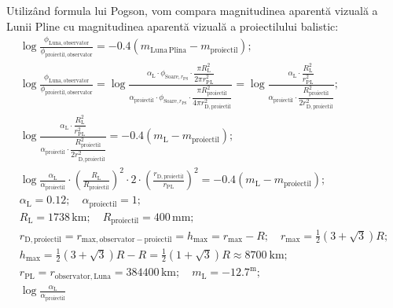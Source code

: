 \begin{description}
  Utiliz\^and formula lui Pogson, vom compara magnitudinea aparent\u{a}
  vizual\u{a} a Lunii Pline cu magnitudinea aparent\u{a} vizual\u{a} a
  proiectilului balistic:
  \begin{gather*}
    \log\frac{\phi_{\mathrm{Luna,observator}}}
      {\phi_{\mathrm{proiectil,observator}}}
      = -0.4\left(m_{\mathrm{Luna\,Plina}}
        - m_{\mathrm{proiectil}}\right); \\
    \log\frac{\phi_{\mathrm{Luna,observator}}}
      {\phi_{\mathrm{proiectil,observator}}}
      = \log\frac{\alpha_{\mathrm{L}}\cdot
        \phi_{\mathrm{Soare},r_{\mathrm{PS}}}\cdot
        \dfrac{\pi R_{\mathrm{L}}^2}{2\pi r_{\mathrm{PL}}^2}}
        {\alpha_{\mathrm{proiectil}}\cdot
        \phi_{\mathrm{Soare},r_{\mathrm{PS}}}\cdot
        \dfrac{\pi R_{\mathrm{proiectil}}^2}
          {4\pi r_{\mathrm{D,proiectil}}^2}}
      = \log\frac{\alpha_{\mathrm{L}}\cdot
        \dfrac{R_{\mathrm{L}}^2}{r_{\mathrm{PL}}^2}}
        {\alpha_{\mathrm{proiectil}}\cdot
        \dfrac{R_{\mathrm{proiectil}}^2}{2r_{\mathrm{D,proiectil}}^2}}; \\
    \log\frac{\alpha_{\mathrm{L}}\cdot
      \dfrac{R_{\mathrm{L}}^2}{r_{\mathrm{PL}}^2}}
      {\alpha_{\mathrm{proiectil}}\cdot
      \dfrac{R_{\mathrm{proiectil}}^2}{2r_{\mathrm{D,proiectil}}^2}}
      = -0.4\left(m_{\mathrm{L}} - m_{\mathrm{proiectil}}\right); \\
    \log\frac{\alpha_{\mathrm{L}}}{\alpha_{\mathrm{proiectil}}}\cdot
      \left(\frac{R_{\mathrm{L}}}{R_{\mathrm{proiectil}}}\right)^2\cdot
      2\cdot\left(\frac{r_{\mathrm{D,proiectil}}}{r_{\mathrm{PL}}}\right)^2
      = -0.4\left(m_{\mathrm{L}} - m_{\mathrm{proiectil}}\right); \\
    \alpha_{\mathrm{L}} = 0.12;\quad \alpha_{\mathrm{proiectil}} = 1; \\
    R_{\mathrm{L}} = 1738\,\mathrm{km};\quad
      R_{\mathrm{proiectil}} = 400\,\mathrm{mm}; \\
    r_{\mathrm{D,proiectil}}
      = r_{\mathrm{max,observator-proiectil}} = h_{\max}
      = r_{\max} - R;\quad
      r_{\max} = \frac{1}{2}\left(3 + \sqrt{3}\right)R; \\
    h_{\max} = \frac{1}{2}\left(3 + \sqrt{3}\right)R - R
      = \frac{1}{2}\left(1 + \sqrt{3}\right)R \approx 8700\ \mathrm{km}; \\
    r_{\mathrm{PL}} = r_{\mathrm{observator,Luna}} = 384400\,\mathrm{km};\quad
      m_{\mathrm{L}} = -12.7^{\mathrm{m}}; \\
    \log\frac{\alpha_{\mathrm{L}}}{\alpha_{\mathrm{proiectil}}}

\end{gather*}
\end{description}
